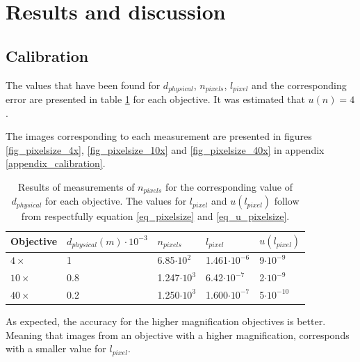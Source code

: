 \section{Results and discussion}

\subsection{Calibration}

The values that have been found for $d_{physical}$, $n_{pixels}$, $l_{pixel}$ and the corresponding error are presented in table \ref{table_pixelsize} for each objective. It was estimated that $u(n) = 4$.

The images corresponding to each measurement are presented in figures \ref{fig_pixelsize_4x}, \ref{fig_pixelsize_10x} and \ref{fig_pixelsize_40x} in appendix \ref{appendix_calibration}.

\begin{table}[h!]


\centering
\captionsetup{font=small, justification = centering}
  \caption{Results of measurements of $n_{pixels}$ for the corresponding value of $d_{physical}$ for each objective. The values for $l_{pixel}$ and $u(l_{pixel})$ follow from respectfully equation \ref{eq_pixelsize} and \ref{eq_u_pixelsize}.}

\begin{tabular}{|l|l|l|l|l|}
\hline

Objective & $d_{physical} (m) \cdot 10^{-3}$ & $n_{pixels}$ & $l_{pixel}$ & $u(l_{pixel})$ \\ \hline
$4\times$ & 1 & 6.85$\cdot 10^2$ & 1.461$\cdot 10^{-6}$ & 9$\cdot 10^{-9}$\\
$10\times$ & 0.8 & 1.247$\cdot 10^3$ & 6.42$\cdot 10^{-7}$ & 2$\cdot 10^{-9}$ \\
$40\times$ & 0.2 & 1.250$\cdot 10^3$ & 1.600$\cdot 10^{-7}$ & 5$\cdot 10^{-10}$ \\ \hline
\end{tabular}

\label{table_pixelsize}
\end{table}

As expected, the accuracy for the higher magnification objectives is better. Meaning that images from an objective with a higher magnification, corresponds with a smaller value for $l_{pixel}$.

